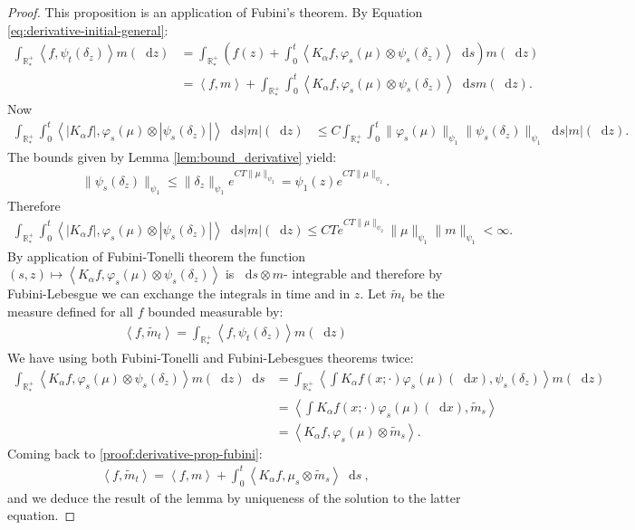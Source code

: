 \documentclass[11pt,a4paper]{article}
\newcommand{\RRP}{\mathbb{R}^+_*}
\newcommand{\brac}[1]{\left\langle#1\right\rangle}
\newcommand{\dd}{\mathop{}\!\mathrm{d}}
\begin{document}
\begin{proof}
    This proposition is an application of Fubini's theorem. By Equation \eqref{eq:derivative-initial-general}:
    \begin{align}
        \int_{\RRP} \brac{f,\psi_t\left(\delta_z\right)}m(\dd z) &= \int_{\RRP}\left( f(z) + \int_0^t \brac{K_\alpha f,\varphi_s(\mu)\otimes\psi_s\left(\delta_z\right)} \dd s \right)m(\dd z) \nonumber\\
        &= \brac{f,m} + \int_{\RRP}\int_0^t \brac{K_\alpha f,\varphi_s(\mu)\otimes\psi_s\left(\delta_z\right)} \dd sm(\dd z).\label{proof:derivative-prop-fubini}
    \end{align}
    Now 
    \begin{align*}
        \int_{\RRP}\int_0^t \brac{ |K_\alpha f|,\varphi_s(\mu)\otimes|\psi_s\left(\delta_z\right)|} \dd s |m|(\dd z) 
        &\leq C\int_{\RRP}\int_0^t\|\varphi_s(\mu)\|_{\psi_1}  \|\psi_s(\delta_z)\|_{\psi_1}\dd s |m|(\dd z).
    \end{align*}
    The bounds given by Lemma \ref{lem:bound_derivative} yield: 
    \begin{align*}
        \|\psi_s(\delta_z)\|_{\psi_1} \leq \|\delta_z\|_{\psi_1}e^{CT\|\mu\|_{\psi_2}} = \psi_1(z)e^{CT\|\mu\|_{\psi_2}}.
    \end{align*}
    Therefore
    \begin{align*}
        \int_{\RRP}\int_0^t \brac{ |K_\alpha f|,\varphi_s(\mu)\otimes|\psi_s\left(\delta_z\right)|} \dd s |m|(\dd z)  \leq CT e^{CT\|\mu\|_{\psi_2}}\|\mu\|_{\psi_1}\|m\|_{\psi_1} < \infty.
    \end{align*}
    By application of Fubini-Tonelli theorem the function $(s,z) \mapsto \brac{ K_\alpha f,\varphi_s(\mu)\otimes\psi_s\left(\delta_z\right)}$ is $\dd s \otimes m$- integrable and therefore by Fubini-Lebesgue we can exchange the integrals in time and in $z$. Let $\tilde{m}_t$ be the measure defined for all $f$  bounded measurable by:
    \begin{align*}
        \brac{f,\tilde{m}_t} = \int_{\RRP} \brac{f,\psi_t\left(\delta_z\right)}m(\dd z)
    \end{align*}
    We have using both Fubini-Tonelli and Fubini-Lebesgues theorems twice:
    \begin{align*}
        \int_{\RRP} \brac{K_\alpha f,\varphi_s(\mu)\otimes\psi_s\left(\delta_z\right)} m(\dd z) \dd s 
        &= \int_{\RRP} \brac{\int K_\alpha f(x;\cdot)\varphi_s(\mu)(\dd x), \psi_s(\delta_z)} m(\dd z) \\
        &= \brac{\int K_\alpha f(x;\cdot)\varphi_s(\mu)(\dd x),\tilde{m}_s} \\
        &= \brac{K_\alpha f, \varphi_s(\mu) \otimes \tilde{m}_s}.
    \end{align*}
    Coming back to \eqref{proof:derivative-prop-fubini}:
    \begin{align*}
        \brac{f,\tilde{m}_t} = \brac{f,m} + \int_0^t \brac{K_\alpha f, \mu_s \otimes \tilde{m}_s} \dd s\ ,
    \end{align*}
    and we deduce the result of the lemma by uniqueness of the solution to the latter equation.
\end{proof}
\end{document}
